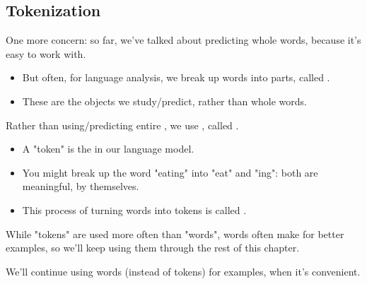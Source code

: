     \subsection{Tokenization}

        One more concern: so far, we've talked about predicting whole words, because it's easy to work with.

        \begin{itemize}
            \item But often, for language analysis, we break up words into parts, called .

            \item These are the objects we study/predict, rather than whole words.\\
        \end{itemize}

        \begin{definition}
            Rather than using/predicting entire , we use , called .

            \begin{itemize}
                \item A "token" is the  in our language model.
            \end{itemize}
        \end{definition}

        \begin{itemize}
            \item \miniex You might break up the word "eating" into "eat" and "ing": both are meaningful, by themselves.

            \item This process of turning words into tokens is called .
        \end{itemize}

        While "tokens" are used more often than "words", words often make for better examples, so we'll keep using them through the rest of this chapter.\\

        \begin{clarification}
            We'll continue using words (instead of tokens) for examples, when it's convenient.
        \end{clarification}

